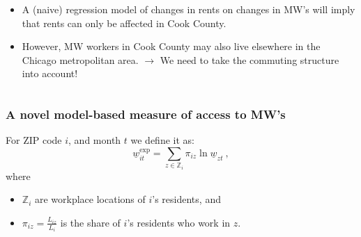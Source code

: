 \documentclass[aspectratio=169, t]{beamer}
\begin{document}
\begin{frame}
\begin{columns}
\begin{column}{0.56\textwidth}
\begin{itemize}
                \vspace{2mm}
                \pause
                \item A (naive) regression model of changes in rents on changes in MW's will imply that rents 
                can only be affected in Cook County.
                \vspace{2mm}
                \pause
                \item However, MW workers in Cook County may also live elsewhere in the 
                Chicago metropolitan area. $\to$ We need to take the commuting structure into account! 
            \end{itemize}
        \end{column}
    \end{columns}
\end{frame}

\begin{frame}
\frametitle{A novel model-based measure of access to MW's}

        For ZIP code $i$, and month $t$ we define it as:
	$$
	\underline{w}^{\text{exp}}_{it} = 
	\sum_{z \in \mathbb{Z}_i} \pi_{i z} \ln \underline{w}_{zt} \ ,
	$$
	\vspace{-2.5mm}
	where
	\vspace{1mm}
	\begin{itemize} \small
		\item $\mathbb{Z}_i$ are workplace locations of $i$'s residents, and
		\item $\pi_{i z} = \frac{L_{i z}}{L_i}$ is the share of $i$'s residents who work 
		in $z$.
	\end{itemize}
\end{frame}
\end{document}
